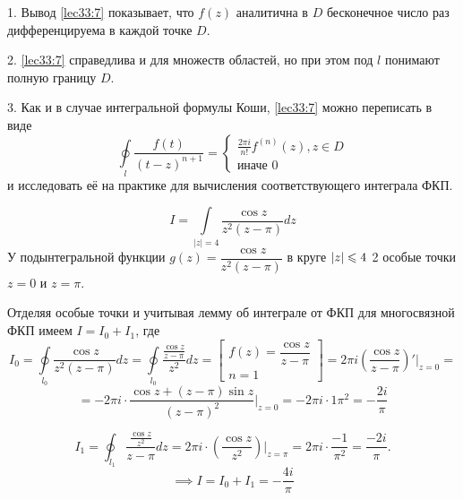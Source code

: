 \documentclass[../../main.tex]{subfiles}
\begin{document}
\begin{rems}
	\item[1.] Вывод \eqref{lec33:7} показывает, что $f(z)$ аналитична в 
	$D$ бесконечное число раз дифференцируема в каждой точке
	$D$.
	\item[2.] \eqref{lec33:7} справедлива и для множеств
	областей, но при этом под $l$ понимают полную границу $D$.
	
	\item[3.] Как и в случае интегральной формулы Коши, 
	\eqref{lec33:7} можно переписать в виде 
	\[
	\oint\limits_l \frac{f(t)}{(t-z)^{n+1}} = 
	\begin{cases}
	\frac{2\pi i}{n!} f^{(n)}(z), z \in D \\
	\text{иначе 0}
	\end{cases}
	\]
	и исследовать её на практике для вычисления
	соответствующего интеграла ФКП.
\end{rems}
\begin{exmp}
	\[
	I = \int\limits_{|z|=4}\frac{\cos z}{z^2 (z-\pi)}
	dz
	\]
	У подынтегральной функции $g(z)=\dfrac{\cos z}
	{z^2(z-\pi)}$ в круге $\left|{z}\right| \leqslant 4$
	2 особые точки $z=0$ и $z=\pi$.
	
	
	Отделяя особые точки и учитывая лемму об 
	интеграле от ФКП для многосвязной ФКП имеем 
	$I = I_0 + I_1$, где 
	\[
	I_0 = 
	\oint\limits_{l_0}\dfrac{\cos z}{z^2(z - \pi)} 
	dz=
	\oint\limits_{l_0}\dfrac{\frac{\cos z}
		{z-\pi}}{z^2} dz
	= \left[
	\begin{array}{l}
	f(z) = \dfrac{\cos z}{z-\pi} \\
	n = 1
	\end{array}
	\right] = 
	2\pi i \left( \dfrac{\cos z}{z-\pi}\right)'
	|_{z=0}=
	\]
	\[= -2\pi i \cdot \dfrac{\cos z + 
		(z - \pi) \sin z}{(z-\pi)^2}|_{z=0}=
	-2\pi i \cdot {1}{\pi ^2} = -\dfrac{2i}{\pi}
	\]
	
	\[
	I_1 = \oint_{l_1} \dfrac{\frac{\cos z}{z^2}}
	{z-\pi} dz = 2 \pi i \cdot \left(
	\dfrac{\cos z}{z^2}
	\right) |_{z=\pi} = 2\pi i \cdot \dfrac{-1}{\pi^2}
	=\dfrac{-2i}{\pi}.
	\]
	\[
	\implies I = I_0 + I_1 = -\dfrac{4i}{\pi}
	\]
\end{exmp}
\end{document}
